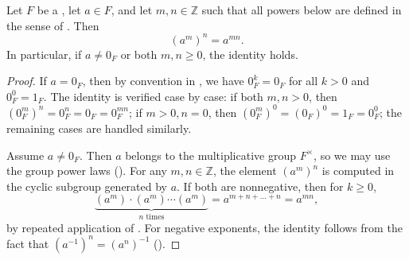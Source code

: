 \begin{lemma} \label{lemma:power_of_a_power_in_an_ordered_field_for_integer_exponents}
    Let $F$ be a , let $a \in F$, and let $m,n \in \mathbb{Z}$ such that all powers below are defined in the sense of . Then
    $$\left(a^m\right)^n = a^{mn}.$$
    In particular, if $a \neq 0_F$ or both $m,n \geq 0$, the identity holds.
\end{lemma}

\begin{proof}
If $a = 0_F$, then by convention in , we have $0_F^k = 0_F$ for all $k > 0$ and $0_F^0 = 1_F$. The identity is verified case by case: if both $m,n > 0$, then $(0_F^m)^n = 0_F^n = 0_F = 0_F^{mn}$; if $m > 0, n = 0$, then $(0_F^m)^0 = (0_F)^0 = 1_F = 0_F^0$; the remaining cases are handled similarly.

Assume $a \neq 0_F$. Then $a$ belongs to the multiplicative group $F^\times$, so we may use the group power laws (). For any $m,n \in \mathbb{Z}$, the element $(a^m)^n$ is computed in the cyclic subgroup generated by $a$. If both are nonnegative, then for $k \geq 0$,
$$\underbrace{(a^m) \cdot (a^m) \cdots (a^m)}_{n \text{ times}} = a^{m+n+\dots+n} = a^{mn},$$
by repeated application of . For negative exponents, the identity follows from the fact that $(a^{-1})^n = (a^n)^{-1}$ ().
\end{proof}
